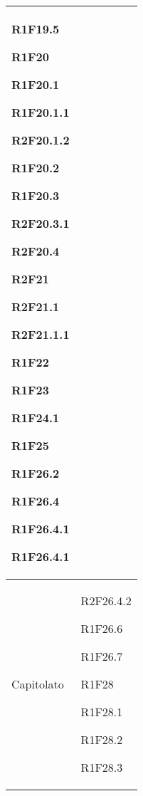 \begin{center}
\begin{longtable}{|p{44mm}|p{22mm}|}
R1F19.5 \newline

R1F20 \newline

R1F20.1 \newline

R1F20.1.1 \newline

R2F20.1.2 \newline

R1F20.2 \newline

R1F20.3 \newline

R2F20.3.1 \newline

R2F20.4 \newline

R2F21 \newline

R2F21.1 \newline

R2F21.1.1 \newline

R1F22 \newline

R1F23 \newline

R1F24.1 \newline

R1F25 \newline

R1F26.2 \newline

R1F26.4 \newline

R1F26.4.1 \newline

R1F26.4.1
\\
\hline
Capitolato &
R2F26.4.2 \newline

R1F26.6 \newline

R1F26.7 \newline

R1F28 \newline

R1F28.1 \newline

R1F28.2 \newline

R1F28.3 \newline


\end{longtable}
\end{center}
